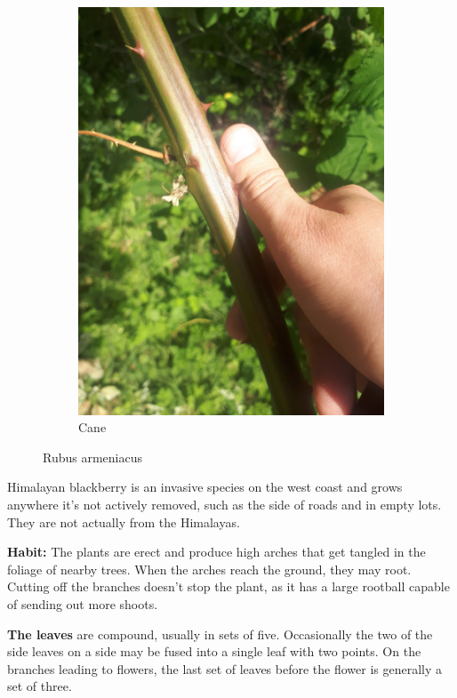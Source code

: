 \begin{figure}
\begin{subfigure}{0.48\textwidth}
    \includegraphics[width=\textwidth]{rubus/armeniacus_cane_01}
    \caption{Cane}
    \label{fig:rub:armeniacus:cane}
\end{subfigure}
        
\caption{Rubus armeniacus}
\label{fig:rub:armeniacus}
\end{figure}

Himalayan blackberry is an invasive species on the west coast and grows anywhere it's not actively removed, such as the side of roads and in empty lots. They are not actually from the Himalayas.

\textbf{Habit:} The plants are erect and produce high arches that get tangled in the foliage of nearby trees. When the arches reach the ground, they may root. Cutting off the branches doesn't stop the plant, as it has a large rootball capable of sending out more shoots. 

\textbf{The leaves} are compound, usually in sets of five. Occasionally the two of the side leaves on a side may be fused into a single leaf with two points. On the branches leading to flowers, the last set of leaves before the flower is generally a set of three.

